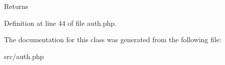 \begin{DoxyReturn}{\-Returns}

\end{DoxyReturn}


\-Definition at line 44 of file auth.\-php.




\-The documentation for this class was generated from the following file\-:\begin{DoxyCompactItemize}
\item 
src/auth.\-php\end{DoxyCompactItemize}
